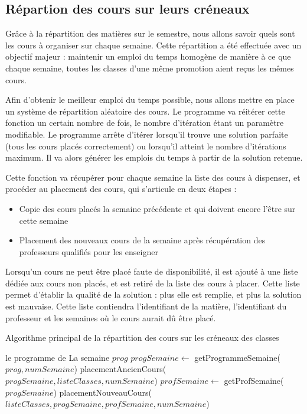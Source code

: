\subsection{Répartion des cours sur leurs créneaux}

Grâce à la répartition des matières sur le semestre, nous allons savoir quels sont les cours à organiser sur chaque semaine. Cette répartition a été effectuée avec un objectif majeur : maintenir un emploi du temps homogène de manière à ce que chaque semaine, toutes les classes d'une même promotion aient reçus les mêmes cours.

Afin d'obtenir le meilleur emploi du temps possible, nous allons mettre en place un système de répartition aléatoire des cours. Le programme va réitérer cette fonction un certain nombre de fois, le nombre d'itération étant un paramètre modifiable. Le programme arrête d'itérer lorsqu'il trouve une solution parfaite (tous les cours placés correctement) ou lorsqu'il atteint le nombre d'itérations maximum. Il va alors générer les emplois du temps à partir de la solution retenue.

Cette fonction va récupérer pour chaque semaine la liste des cours à dispenser, et procéder au placement des cours, qui s'articule en deux étapes :\\

\begin{itemize}
\item Copie des cours placés la semaine précédente et qui doivent encore l'être sur cette semaine
\item Placement des nouveaux cours de la semaine après récupération des professeurs qualifiés pour les enseigner
\end{itemize}

Lorsqu'un cours ne peut être placé faute de disponibilité, il est ajouté à une liste dédiée aux cours non placés, et est retiré de la liste des cours à placer. Cette liste permet d'établir la qualité de la solution : plus elle est remplie, et plus la solution est mauvaise. Cette liste contiendra l'identifiant de la matière, l'identifiant du professeur et les semaines où le cours aurait dû être placé.

\begin{algorithm}
\caption {Algorithme principal de la répartition des cours sur les créneaux des classes}
\begin{algorithmic}
\REQUIRE le programme de La semaine $prog$
\STATE $progSemaine \leftarrow$ getProgrammeSemaine($prog, numSemaine$)
\STATE placementAncienCours($progSemaine, listeClasses, numSemaine$)
\STATE $profSemaine \leftarrow$ getProfSemaine($progSemaine$)
\STATE placementNouveauCours($listeClasses, progSemaine, profSemaine, numSemaine$)
\ENDIF
{}
\ENDIF
\ENDFOR
{}
\end{algorithmic}
\end{algorithm}

